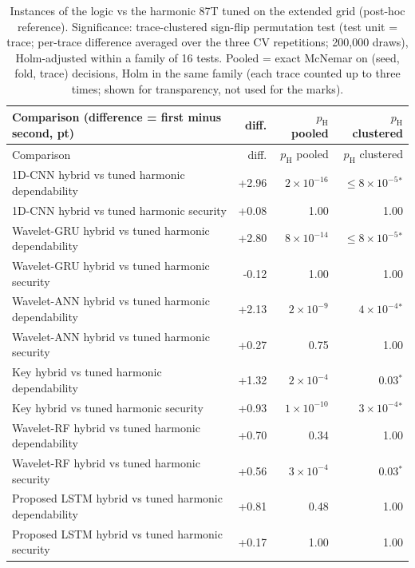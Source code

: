 \begin{longtable}{@{}p{8.6cm}rrr@{}}
\caption{Instances of the logic vs the harmonic 87T tuned on the extended grid (post-hoc reference). Significance: trace-clustered sign-flip permutation test (test unit = trace; per-trace difference averaged over the three CV repetitions; 200{,}000 draws), Holm-adjusted within a family of 16 tests. Pooled = exact McNemar on (seed, fold, trace) decisions, Holm in the same family (each trace counted up to three times; shown for transparency, not used for the marks).}\label{tab:S9}\\
\toprule Comparison (difference = first minus second, pt) & diff. & $p_{\mathrm{H}}$ pooled & $p_{\mathrm{H}}$ clustered \\ \midrule \endfirsthead
\toprule Comparison & diff. & $p_{\mathrm{H}}$ pooled & $p_{\mathrm{H}}$ clustered \\ \midrule \endhead
1D-CNN hybrid vs tuned harmonic dependability & +2.96 & $2\times10^{-16}$ & $\le 8\times10^{-5}$$^{*}$ \\
1D-CNN hybrid vs tuned harmonic security & +0.08 & 1.00 & 1.00 \\
Wavelet-GRU hybrid vs tuned harmonic dependability & +2.80 & $8\times10^{-14}$ & $\le 8\times10^{-5}$$^{*}$ \\
Wavelet-GRU hybrid vs tuned harmonic security & -0.12 & 1.00 & 1.00 \\
Wavelet-ANN hybrid vs tuned harmonic dependability & +2.13 & $2\times10^{-9}$ & $4\times10^{-4}$$^{*}$ \\
Wavelet-ANN hybrid vs tuned harmonic security & +0.27 & 0.75 & 1.00 \\
Key hybrid vs tuned harmonic dependability & +1.32 & $2\times10^{-4}$ & 0.03$^{*}$ \\
Key hybrid vs tuned harmonic security & +0.93 & $1\times10^{-10}$ & $3\times10^{-4}$$^{*}$ \\
Wavelet-RF hybrid vs tuned harmonic dependability & +0.70 & 0.34 & 1.00 \\
Wavelet-RF hybrid vs tuned harmonic security & +0.56 & $3\times10^{-4}$ & 0.03$^{*}$ \\
Proposed LSTM hybrid vs tuned harmonic dependability & +0.81 & 0.48 & 1.00 \\
Proposed LSTM hybrid vs tuned harmonic security & +0.17 & 1.00 & 1.00 \\
\bottomrule
\end{longtable}